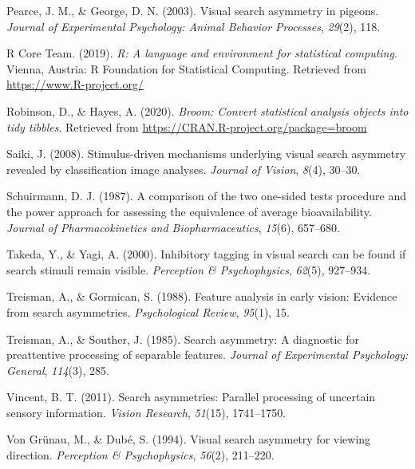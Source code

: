 \documentclass[
  english,
  man,floatsintext]{apa6}
\begin{document}
\leavevmode\hypertarget{ref-pearce2003visual}{}%
Pearce, J. M., \& George, D. N. (2003). Visual search asymmetry in pigeons. \emph{Journal of Experimental Psychology: Animal Behavior Processes}, \emph{29}(2), 118.

\leavevmode\hypertarget{ref-R-base}{}%
R Core Team. (2019). \emph{R: A language and environment for statistical computing}. Vienna, Austria: R Foundation for Statistical Computing. Retrieved from \url{https://www.R-project.org/}

\leavevmode\hypertarget{ref-R-broom}{}%
Robinson, D., \& Hayes, A. (2020). \emph{Broom: Convert statistical analysis objects into tidy tibbles}. Retrieved from \url{https://CRAN.R-project.org/package=broom}

\leavevmode\hypertarget{ref-saiki2008stimulus}{}%
Saiki, J. (2008). Stimulus-driven mechanisms underlying visual search asymmetry revealed by classification image analyses. \emph{Journal of Vision}, \emph{8}(4), 30--30.

\leavevmode\hypertarget{ref-schuirmann1987comparison}{}%
Schuirmann, D. J. (1987). A comparison of the two one-sided tests procedure and the power approach for assessing the equivalence of average bioavailability. \emph{Journal of Pharmacokinetics and Biopharmaceutics}, \emph{15}(6), 657--680.

\leavevmode\hypertarget{ref-takeda2000inhibitory}{}%
Takeda, Y., \& Yagi, A. (2000). Inhibitory tagging in visual search can be found if search stimuli remain visible. \emph{Perception \& Psychophysics}, \emph{62}(5), 927--934.

\leavevmode\hypertarget{ref-treisman1988feature}{}%
Treisman, A., \& Gormican, S. (1988). Feature analysis in early vision: Evidence from search asymmetries. \emph{Psychological Review}, \emph{95}(1), 15.

\leavevmode\hypertarget{ref-treisman1985search}{}%
Treisman, A., \& Souther, J. (1985). Search asymmetry: A diagnostic for preattentive processing of separable features. \emph{Journal of Experimental Psychology: General}, \emph{114}(3), 285.

\leavevmode\hypertarget{ref-vincent2011search}{}%
Vincent, B. T. (2011). Search asymmetries: Parallel processing of uncertain sensory information. \emph{Vision Research}, \emph{51}(15), 1741--1750.

\leavevmode\hypertarget{ref-von1994visual}{}%
Von Grünau, M., \& Dubé, S. (1994). Visual search asymmetry for viewing direction. \emph{Perception \& Psychophysics}, \emph{56}(2), 211--220.
\end{document}
